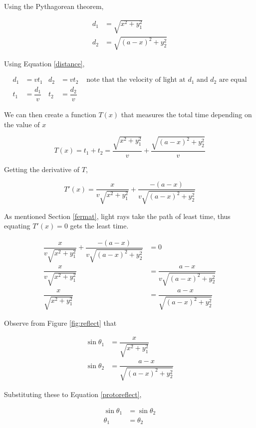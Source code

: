 \documentclass[a4paper,12pt]{article}
\begin{document}
Using the Pythagorean theorem,

\begin{align}
d_1 &= \sqrt{x^2 + y_1^2} \nonumber\\
d_2 &= \sqrt{(a-x)^2 +y_2^2} \nonumber
\end{align}

Using Equation \eqref{distance},

\begin{align}
d_1 &= vt_1 & d_2 &= vt_2 & \text{ note that the velocity of light at } d_1 \text{ and } d_2 \text{ are equal} \nonumber\\
t_1 &= \dfrac{d_1}{v} & t_2 &= \dfrac{d_2}{v}
\end{align}

We can then create a function $T(x)$ that measures the total time depending on the value of $x$

\begin{equation} 
T(x) = t_1 + t_2 = \dfrac{\sqrt{x^2 +y_1^2}}{v} + \dfrac{\sqrt{(a-x)^2 + y_2^2}}{v}
\end{equation}

Getting the derivative of $T$,

\begin{equation}
T'(x) = \dfrac{x}{v\sqrt{x^2 + y_1^2}} + \dfrac{-(a-x)}{v\sqrt{(a-x)^2 + y_2^2}}
\end{equation}

As mentioned Section \ref{fermat}, light rays take the path of least time, thus equating $T'(x) = 0$ gets the least time.

\begin{align}
\dfrac{x}{v\sqrt{x^2 + y_1^2}} + \dfrac{-(a-x)}{v\sqrt{(a-x)^2 + y_2^2}} &= 0 \nonumber\\
\dfrac{x}{v\sqrt{x^2 + y_1^2}} &= \dfrac{a-x}{v\sqrt{(a-x)^2 + y_2^2}}\nonumber\\
\dfrac{x}{\sqrt{x^2 + y_1^2}} &= \dfrac{a-x}{\sqrt{(a-x)^2 + y_2^2}} \label{protoreflect}
\end{align}

Observe from Figure \ref{fig:reflect} that

\begin{align}
\sin \theta_1 &= \dfrac{x}{\sqrt{x^2 + y_1^2}} \\
\sin \theta_2 &= \dfrac{a-x}{\sqrt{(a-x)^2 + y_2^2}} 
\end{align}

Substituting these to Equation \eqref{protoreflect},

\begin{align}
\sin \theta_1 &= \sin \theta_2 \nonumber\\
\theta_1 &= \theta_2 \label{reflect}
\end{align}
\end{document}
